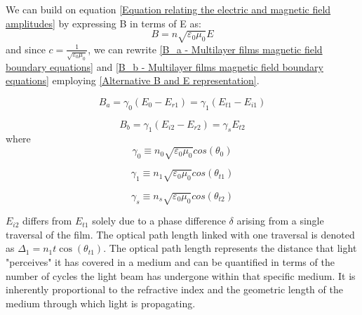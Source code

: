 We can build on equation \ref{Equation relating the electric and magnetic field amplitudes} by expressing B in terms of E as:
    \begin{equation} \label{Alternative B and E representation}
    B = n\sqrt{\varepsilon_0\mu_0}E
    \end{equation}
and since $c=\frac{1}{\sqrt{\varepsilon_0\mu_0}}$, we can rewrite \ref{B_a - Multilayer films magnetic field boundary equations} and \ref{B_b - Multilayer films magnetic field boundary equations} employing \ref{Alternative B and E representation}.

    \begin{equation} \label{Alternative B_a - Multilayer films magnetic field boundary equations}
    B_a = \gamma_0(E_0 - E_{r1}) = \gamma_1(E_{t1} - E_{i1})
    \end{equation}

    \begin{equation} \label{Alternative B_b - Multilayer films magnetic field boundary equations}
    B_b = \gamma_1(E_{i2} - E_{r2}) = \gamma_sE_{t2}
    \end{equation}
where
    \begin{equation} \label{gamma 0}
        \gamma_0 \equiv n_0 \sqrt{\varepsilon_0\mu_0} cos(\theta_0)
    \end{equation}

    \begin{equation} \label{gamma 1}
        \gamma_1 \equiv n_1 \sqrt{\varepsilon_0\mu_0} cos(\theta_{t1})
    \end{equation}

    \begin{equation} \label{gamma s}
        \gamma_s \equiv n_s \sqrt{\varepsilon_0\mu_0} cos(\theta_{t2})
    \end{equation}

$E_{i2}$ differs from $E_{t1}$ solely due to a phase difference $\delta$ arising from a single traversal of the film. The optical path length linked with one traversal is denoted as $\Delta_1=n_1t\cos(\theta_{t1})$. The optical path length represents the distance that light "perceives" it has covered in a medium and can be quantified in terms of the number of cycles the light beam has undergone within that specific medium. It is inherently proportional to the refractive index and the geometric length of the medium through which light is propagating. %

